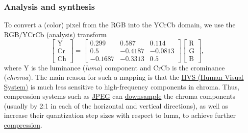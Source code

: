 \subsubsection{Analysis and synthesis}
To convert a (color) pixel from the RGB into the YCrCb domain, we use
the RGB/YCrCb (analysis) transform~\cite{malvar2008lifting}
\begin{equation}
  \begin{bmatrix}
    \text{Y} \\
    \text{Cr} \\
    \text{Cb}
  \end{bmatrix}
  =
  \begin{bmatrix}
    0.299   &   0.587 & 0.114 \\ 
    0.5     & -0.4187 & -0.0813 \\
    -0.1687 & -0.3313 & 0.5
  \end{bmatrix}
  \begin{bmatrix}
    \text{R} \\
    \text{G} \\
    \text{B}
  \end{bmatrix},
  \label{eq:YCrCb}
\end{equation}
where Y is the luminance (\emph{luma}) component and CrCb is the
crominance (\emph{chroma}). The main reason for such a mapping is that
the \href{https://en.wikipedia.org/wiki/Visual_system}{HVS (Human
  Visual System)} is much less sensitive to high-frequency components
in chroma. Thus, compression systems such as
\href{https://en.wikipedia.org/wiki/JPEG}{JPEG} can
\href{https://en.wikipedia.org/wiki/Downsampling_(signal_processing)}{downsample}
the chroma components (usually by 2:1 in each of the horizontal and
vertical directions), as well as increase their quantization step
sizes with respect to luma, to achieve further
\href{https://en.wikipedia.org/wiki/Data_compression_ratio}{compression}.

